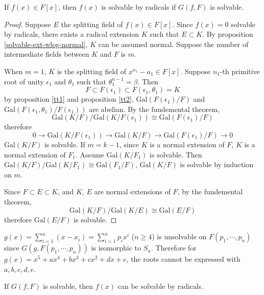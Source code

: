 \begin{theorem}
    If $f(x)\in F[x]$, then $f(x)$ is solvable by radicals if $G(f,F)$ is solvable.
\end{theorem}
\begin{proof}
    Suppose $E$ the splitting field of $f(x)\in F[x]$. Since $f(x)=0$ solvable by radicals, there exists a radical extension $K$ such that $E\subset K$. By proposition \ref{solvable-ext-wlog-normal}, $K$ can be assumed normal. Suppose the number of intermediate fields between $K$ and $F$ is $m$.
    \par When $m=1$, $K$ is the splitting field of $x^{n_1}-a_1\in F[x]$. Suppose $n_1$-th primitive root of unity $\epsilon_1$ and $\theta_1$ such that $\theta_1^{n-1}=\beta$. Then
    $$
    F\subset F(\epsilon_1)\subset F(\epsilon_1,\theta_1)=K
    $$
    by proposition \ref{tt1} and proposition \ref{tt2}, $\mathrm{Gal}(F(\epsilon_1)/F)$ and $\mathrm{Gal}(F(\epsilon_1,\theta_1)/F(\epsilon_1))$ are abelian. By the fundemental theorem,
    $$
    \mathrm{Gal}(K/F)/\mathrm{Gal}(K/F(\epsilon_1))\cong\mathrm{Gal}(F(\epsilon_1)/F)
    $$
    therefore
    $$
    0\to\mathrm{Gal}(K/F(\epsilon_1))\to\mathrm{Gal}(K/F)\to\mathrm{Gal}(F(\epsilon_1)/F)\to 0
    $$
    $\mathrm{Gal}(K/F)$ is solvable. If $m=k-1$, since $K$ is a normal extension of $F$, $K$ is a normal extension of $F_1$. Assume $\mathrm{Gal}(K/F_1)$ is solvable. Then $\mathrm{Gal}(K/F)/\mathrm{Gal}(K/F_1)\cong\mathrm{Gal}(F_1/F)$, $\mathrm{Gal}(K/F)$ is solvable by induction on $m$.
    \par Since $F\subset E\subset K$, and $K$, $E$ are normal extensions of $F$, by the fundemental theorem,
    $$
    \mathrm{Gal}(K/F)/\mathrm{Gal}(K/E)\cong\mathrm{Gal}(E/F)
    $$
    therefore $\mathrm{Gal}(E/F)$ is solvable.
\end{proof}
\begin{remark}
    $g(x)=\sum^n_{i=1}(x-x_i)=\sum^n_{i=1}p_ix^i$ ($n\ge 4$) is unsolvable on $F(p_1,\cdots,p_n)$ since $G(g,F(p_1,\cdots,p_n))$ is isomorphic to $S_n$. Therefore for $g(x)=x^5+ax^4+bx^3+cx^2+dx+e$, the roots cannot be expressed with $a,b,c,d,e$.
\end{remark}
\begin{theorem}\label{reverse}
    If $G(f,F)$ is solvable, then $f(x)$ can be solvable by radicals.
\end{theorem}
